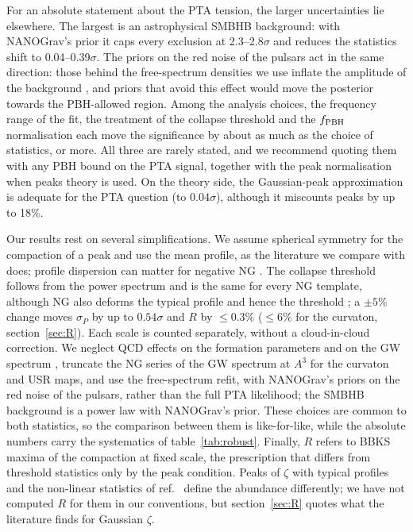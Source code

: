 \documentclass[a4paper,11pt]{article}
\newcommand{\fpbh}{f_{\rm PBH}}
\begin{document}
For an absolute statement about the PTA tension, the larger uncertainties lie elsewhere. The
largest is an astrophysical SMBHB background: with NANOGrav's prior it caps every exclusion at
2.3--2.8$\sigma$ and reduces the statistics shift to 0.04--0.39$\sigma$. The priors on the red
noise of the pulsars act in the same direction: those behind the free-spectrum densities we use
inflate the amplitude of the background \cite{DZA26}, and priors that avoid this effect would move
the posterior towards the PBH-allowed region. Among the analysis choices, the frequency range of
the fit, the treatment of the collapse threshold and the $\fpbh$ normalisation each move the
significance by about as much as the choice of statistics, or more.
All three are rarely stated, and we recommend quoting them with any PBH bound on the PTA signal,
together with the peak normalisation when peaks theory is used. On the theory side, the
Gaussian-peak approximation is adequate for the PTA question (to $0.04\sigma$), although it
miscounts peaks by up to 18\%.

Our results rest on several simplifications. We assume spherical symmetry for the compaction of a
peak \cite{Young22} and use the mean profile, as the literature we compare with does; profile
dispersion can matter for negative NG \cite{Escriva26}. The collapse threshold follows from the
power spectrum and is the same for every NG template, although NG also deforms the typical profile
and hence the threshold \cite{KMR19,ETYY22}; a $\pm5\%$ change moves $\sigma_P$ by up to
$0.54\sigma$ and $R$ by $\le0.3\%$ ($\le6\%$ for the curvaton, section~\ref{sec:R}). Each scale is
counted separately, without a cloud-in-cloud correction. We neglect QCD effects on the formation
parameters \cite{MJY23,FMPU22} and on the GW spectrum \cite{ATU21,BDF23}, truncate the NG series of
the GW spectrum at $A^3$ for the curvaton and USR maps, and use the free-spectrum refit, with
NANOGrav's priors on the red noise of the pulsars, rather than the full PTA likelihood; the SMBHB
background is a power law with NANOGrav's prior. These choices are common to both statistics, so the comparison between them is like-for-like, while the
absolute numbers carry the systematics of table~\ref{tab:robust}. Finally, $R$ refers to BBKS
maxima of the compaction at fixed scale, the prescription that differs from threshold statistics
only by the peak condition. Peaks of $\zeta$ with typical profiles \cite{Yoo18,Yoo20,Kitajima}
and the non-linear statistics of ref.~\cite{GS20} define the abundance differently; we have not
computed $R$ for them in our conventions, but section~\ref{sec:R} quotes what the literature
finds for Gaussian $\zeta$.
\end{document}
